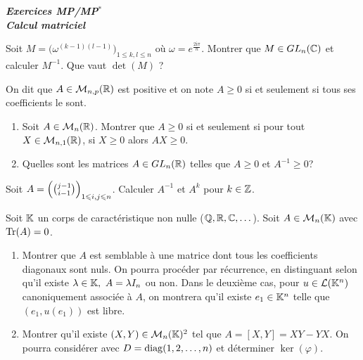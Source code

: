 \documentclass[12pt]{article}
\begin{document}
\begin{titlepage}
	\centering
	\vspace*{\fill}
	\Huge \textit{\textbf{Exercices MP/MP$^*$\\ Calcul matriciel}}
	\vspace*{\fill}
\end{titlepage}

\begin{exercise}
	Soit $M=\bigl(\omega^{(k-1)(l-1)}\bigr)_{1\leqslant k,l\leqslant n}$ où
	$\omega=e^{\frac{2\mathrm{i}\pi}{n}}$. Montrer que $M\in GL_{n}(\mathbb{C})$ et
	calculer $M^{-1}$. Que vaut $\det(M)$ ?
\end{exercise}

\begin{exercise}
	On dit que $A\in\mathcal{M}_{n,p}(\mathbb{R})$ est positive et on note $A\geqslant0$ si et
	seulement si tous ses coefficients le sont.
	\begin{enumerate}
		\item
		Soit $A\in\mathcal{M}_{n}(\mathbb{R})$. Montrer que $A\geqslant0$ si et seulement si pour
		tout $X\in\mathcal{M}_{n,1}(\mathbb{R})$, si $X\geqslant0$ alors $AX\geqslant0$.
		\item
		Quelles sont les matrices $A\in GL_{n}(\mathbb{R})$ telles que $A\geqslant0$ et
		$A^{-1}\geqslant0$?
	\end{enumerate}
\end{exercise}

\begin{exercise}
	Soit $A=\Bigl(\binom{j-1}{i-1}\Bigr)_{1\leqslant i,j\leqslant n}$. Calculer
	$A^{-1}$ et $A^{k}$ pour $k\in\mathbb{Z}$.
\end{exercise}

\begin{exercise}
	Soit $\mathbb{K}$ un corps de caractéristique non nulle ($\mathbb{Q},\mathbb{R},\mathbb{C},\dots$). Soit
	$A\in\mathcal{M}_{n}(\mathbb{K})$ avec $\operatorname{Tr}(A)=0$.
	\begin{enumerate}
		\item
		Montrer que $A$ est semblable à une matrice dont tous les coefficients
		diagonaux sont nuls. On pourra procéder par récurrence, en distinguant
		selon qu'il existe $\lambda\in\mathbb{K},~A=\lambda I_{n}$ ou non. Dans le
		deuxième cas, pour $u\in\mathcal{L}(\mathbb{K}^{n})$ canoniquement associée à $A$, on
		montrera qu'il existe $e_{1}\in\mathbb{K}^{n}$ telle que $(e_{1},u(e_{1}))$ est
		libre.
		\item
		Montrer qu'il existe $(X,Y)\in\mathcal{M}_{n}(\mathbb{K})^{2}$ tel que $A=[X,Y]=XY-YX$. On
		pourra considérer 
		avec $D=\operatorname{diag}(1,2,\dots,n)$ et déterminer $\ker(\varphi)$.
	\end{enumerate}
\end{exercise}
\end{document}

